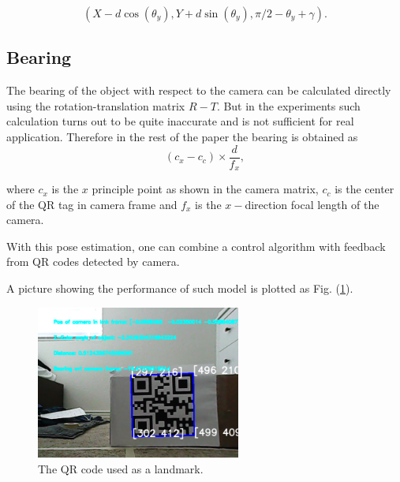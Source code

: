 \documentclass[12pt]{article}
\begin{document}
$$(X-d\cos(\theta_y),Y+d\sin(\theta_y),\pi/2-\theta_y+\gamma).$$
\subsection{Bearing}
The bearing of the object with respect to the camera can be calculated directly using the rotation-translation matrix $R-T$. But in the experiments such calculation turns out to be quite inaccurate and is not sufficient for real application. Therefore in the rest of the paper the bearing is obtained as $$(c_x-c_c)\times \frac{d}{f_x},$$

where $c_x$ is the $x$ principle point as shown in the camera matrix, $c_c$ is the center of the QR tag in camera frame and $f_x$ is the $x-$direction focal length of the camera.

With this pose estimation, one can combine a control algorithm with feedback from QR codes detected by camera.

A picture showing the performance of such model is plotted as  Fig. (\ref{QR}).\begin{figure}[htbp]
\centering
\includegraphics[width=0.6\textwidth]{../figs/bearing_distance.png}
\caption{The QR code used as a landmark.}\label{QR}
\end{figure}
\end{document}
